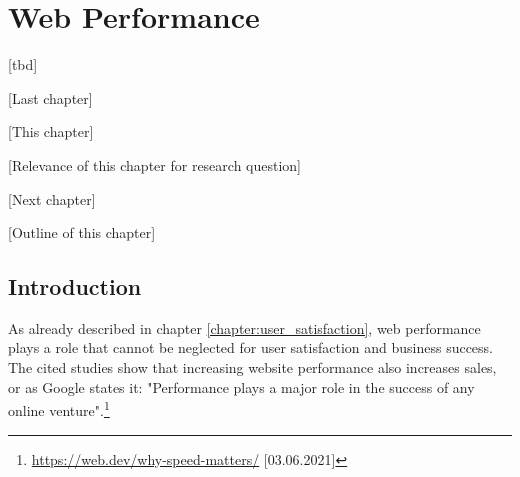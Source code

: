 \chapter{Web Performance}

[tbd]


[Last chapter]



[This chapter]





[Relevance of this chapter for research question]





[Next chapter]





[Outline of this chapter]












\section{Introduction}
\label{chapter:web_performance}






As already described in chapter \ref{chapter:user_satisfaction}, web performance plays a role that cannot be neglected for user satisfaction and business success.
The cited studies show that increasing website performance also increases sales, or as Google states it: "Performance plays a major role in the success of any online venture".\footnote{\url{https://web.dev/why-speed-matters/} [03.06.2021]}

